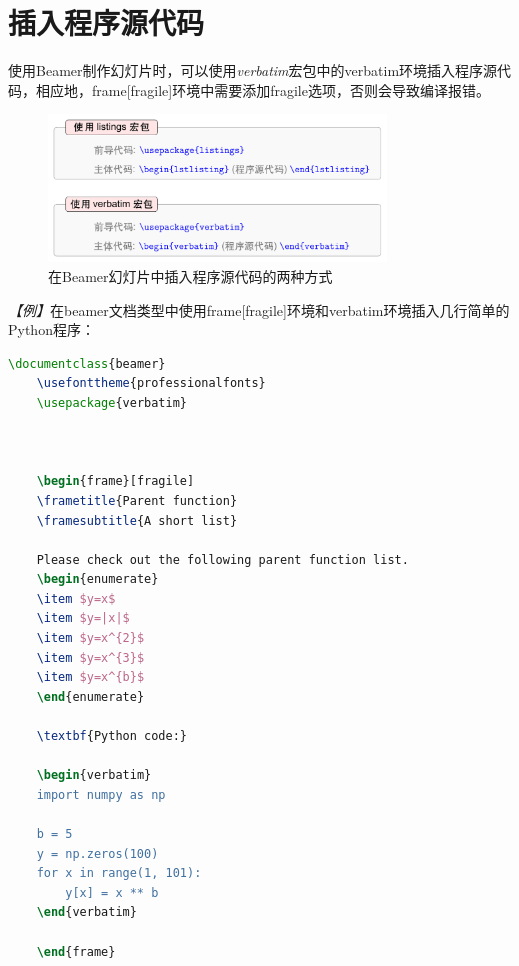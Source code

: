 \section{插入程序源代码}

使用Beamer制作幻灯片时，可以使用\emph{verbatim}宏包中的verbatim环境插入程序源代码，相应地，frame[fragile]环境中需要添加fragile选项，否则会导致编译报错。

\begin{figure}[htbp]
    \centering
    \includegraphics[width = 0.8\textwidth]{images/ch_9/insert_source_codes.pdf}
    \caption{在Beamer幻灯片中插入程序源代码的两种方式}
    \label{fig:936}
\end{figure}

\emph{【例】}在beamer文档类型中使用frame[fragile]环境和verbatim环境插入几行简单的Python程序：
\begin{lstlisting}[language=TeX]
    \documentclass{beamer}
    \usefonttheme{professionalfonts}
    \usepackage{verbatim}

    

    \begin{frame}[fragile]
    \frametitle{Parent function}
    \framesubtitle{A short list}

    Please check out the following parent function list.
    \begin{enumerate}
    \item $y=x$
    \item $y=|x|$
    \item $y=x^{2}$
    \item $y=x^{3}$
    \item $y=x^{b}$
    \end{enumerate}

    \textbf{Python code:}

    \begin{verbatim}
    import numpy as np

    b = 5
    y = np.zeros(100)
    for x in range(1, 101):
        y[x] = x ** b
    \end{verbatim}

    \end{frame}

    
\end{lstlisting}

